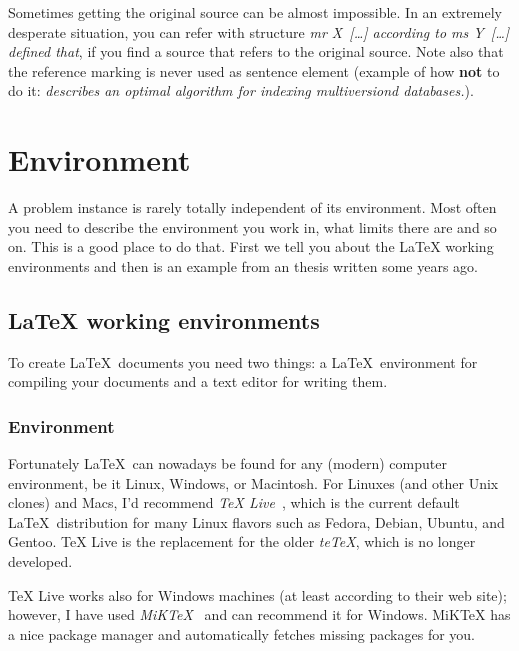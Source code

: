 \documentclass[12pt,a4paper,oneside,pdftex]{report}
\begin{document}
Sometimes getting the original source can be almost impossible. In an
extremely desperate situation, you can refer with structure \emph{mr
  X~[\ldots] according to ms Y~[\ldots] defined that}, if you find a
source that refers to the original source. Note also that the
reference marking is never used as sentence element (example of how
\textbf{not} to do it: \emph{\cite{HaapasaloThesis} describes
an optimal algorithm for indexing multiversiond databases.}).



% 

\chapter{Environment}
\label{chapter:environment}

A problem instance is rarely totally independent of its environment.
Most often you need to describe the environment you work in, what
limits there are and so on. This is a good place to do that. First we
tell you about the LaTeX working environments and then is an example
from an thesis written some years ago.


\section{LaTeX working environments}
\label{sec:environments}

To create \LaTeX\ documents you need two things: a \LaTeX\ environment for
compiling your documents and a text editor for writing them.

\subsection{Environment}

Fortunately \LaTeX\ can nowadays be found for any (modern) computer
environment, be it Linux, Windows, or Macintosh.
For Linuxes (and other Unix clones) and Macs, I'd recommend \emph{TeX
Live}~\cite{TeXLive}, which is the current default \LaTeX\ distribution for
many Linux flavors such as Fedora, Debian, Ubuntu, and Gentoo.
TeX Live is the replacement for the older \emph{teTeX}, which is
no longer developed.

TeX Live works also for Windows machines (at least according to their web
site); however, I have used \emph{MiKTeX}~\cite{MiKTeX} and can recommend it
for Windows.
MiKTeX has a nice package manager and automatically fetches missing packages
for you.
\end{document}
